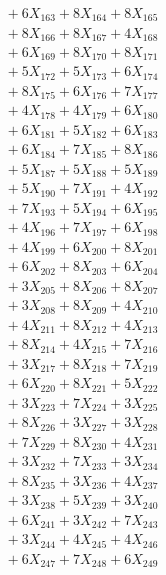 \documentclass[a4paper,10pt]{article}
\begin{document}
{\begin{align}
&\;  + 6 X_{163} + 8 X_{164} + 8 X_{165} \\[0.3ex]
&\;  + 8 X_{166} + 8 X_{167} + 4 X_{168} \\[0.3ex]
&\;  + 6 X_{169} + 8 X_{170} + 8 X_{171} \\[0.3ex]
&\;  + 5 X_{172} + 5 X_{173} + 6 X_{174} \\[0.3ex]
&\;  + 8 X_{175} + 6 X_{176} + 7 X_{177} \\[0.3ex]
&\;  + 4 X_{178} + 4 X_{179} + 6 X_{180} \\[0.3ex]
&\;  + 6 X_{181} + 5 X_{182} + 6 X_{183} \\[0.3ex]
&\;  + 6 X_{184} + 7 X_{185} + 8 X_{186} \\[0.3ex]
&\;  + 5 X_{187} + 5 X_{188} + 5 X_{189} \\[0.5ex]\allowbreak
&\;  + 5 X_{190} + 7 X_{191} + 4 X_{192} \\[0.3ex]
&\;  + 7 X_{193} + 5 X_{194} + 6 X_{195} \\[0.3ex]
&\;  + 4 X_{196} + 7 X_{197} + 6 X_{198} \\[0.3ex]
&\;  + 4 X_{199} + 6 X_{200} + 8 X_{201} \\[0.3ex]
&\;  + 6 X_{202} + 8 X_{203} + 6 X_{204} \\[0.3ex]
&\;  + 3 X_{205} + 8 X_{206} + 8 X_{207} \\[0.3ex]
&\;  + 3 X_{208} + 8 X_{209} + 4 X_{210} \\[0.3ex]
&\;  + 4 X_{211} + 8 X_{212} + 4 X_{213} \\[0.3ex]
&\;  + 8 X_{214} + 4 X_{215} + 7 X_{216} \\[0.3ex]
&\;  + 3 X_{217} + 8 X_{218} + 7 X_{219} \\[0.5ex]\allowbreak
&\;  + 6 X_{220} + 8 X_{221} + 5 X_{222} \\[0.3ex]
&\;  + 3 X_{223} + 7 X_{224} + 3 X_{225} \\[0.3ex]
&\;  + 8 X_{226} + 3 X_{227} + 3 X_{228} \\[0.3ex]
&\;  + 7 X_{229} + 8 X_{230} + 4 X_{231} \\[0.3ex]
&\;  + 3 X_{232} + 7 X_{233} + 3 X_{234} \\[0.3ex]
&\;  + 8 X_{235} + 3 X_{236} + 4 X_{237} \\[0.3ex]
&\;  + 3 X_{238} + 5 X_{239} + 3 X_{240} \\[0.3ex]
&\;  + 6 X_{241} + 3 X_{242} + 7 X_{243} \\[0.3ex]
&\;  + 3 X_{244} + 4 X_{245} + 4 X_{246} \\[0.3ex]
&\;  + 6 X_{247} + 7 X_{248} + 6 X_{249} \\[0.5ex]\allowbreak

\end{align}}
\end{document}

